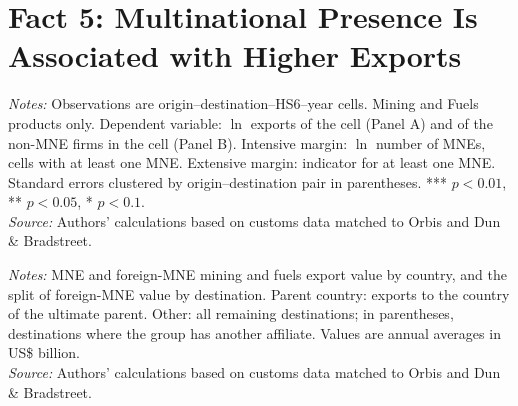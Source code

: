\documentclass[11pt,a4paper]{article}
\begin{document}
\section{Fact 5: Multinational Presence Is Associated with Higher Exports}\label{sec:f5_mining}
\begin{table}[H]\centering\small%
  \caption{Mining and Fuels: Multinational Presence and Exports}%
  \label{tab:t1_mining}%
  \par\vspace{3pt}%
  \begin{minipage}{0.95\textwidth}\footnotesize %
  \textit{Notes:} Observations are origin--destination--HS6--year cells. Mining and Fuels products only. Dependent variable: $\ln$ exports of the cell (Panel A) and of the non-MNE firms in the cell (Panel B). Intensive margin: $\ln$ number of MNEs, cells with at least one MNE. Extensive margin: indicator for at least one MNE. Standard errors clustered by origin--destination pair in parentheses. *** $p<0.01$, ** $p<0.05$, * $p<0.1$.\\[3pt]%
  \textit{Source:} Authors' calculations based on customs data matched to Orbis and Dun \& Bradstreet.%
  \end{minipage}%
  \end{table}
\begin{table}[H]\centering\small%
  \caption{Mining and Fuels: Multinational Exports by Exporting Country and Destination Type}%
  \label{tab:pres_mining}%
  \par\vspace{3pt}%
  \begin{minipage}{0.95\textwidth}\footnotesize %
  \textit{Notes:} MNE and foreign-MNE mining and fuels export value by country, and the split of foreign-MNE value by destination. Parent country: exports to the country of the ultimate parent. Other: all remaining destinations; in parentheses, destinations where the group has another affiliate. Values are annual averages in US\$ billion.\\[3pt]%
  \textit{Source:} Authors' calculations based on customs data matched to Orbis and Dun \& Bradstreet.%
  \end{minipage}%
  \end{table}
\end{document}
